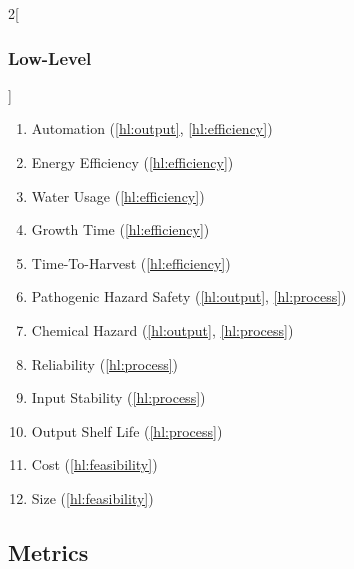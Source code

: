 \documentclass{../tex/report}
\begin{document}
\begin{multicols}{2}[\subsubsection{Low-Level}\label{sec:llos}]
\begin{enumerate}[label=LL\arabic*., ref=LL\arabic*]
        \item \label{ll:automation} Automation                              \hfill (\ref{hl:output}, \ref{hl:efficiency})
        \item \label{ll:efficiency_energy} Energy Efficiency                \hfill (\ref{hl:efficiency})
        \item \label{ll:efficiency_water} Water Usage                       \hfill (\ref{hl:efficiency})
        \item \label{ll:time_growth} Growth Time                            \hfill (\ref{hl:efficiency})
        \item \label{ll:time} Time-To-Harvest                               \hfill (\ref{hl:efficiency})
        \item \label{ll:safety_pathogen} Pathogenic Hazard Safety           \hfill (\ref{hl:output}, \ref{hl:process})
        \item \label{ll:safety_chemical} Chemical Hazard                    \hfill (\ref{hl:output}, \ref{hl:process})
        \item \label{ll:reliability} Reliability                            \hfill (\ref{hl:process})
        \item \label{ll:stability_input} Input Stability                    \hfill (\ref{hl:process})
        \item \label{ll:stability_output} Output Shelf Life                 \hfill (\ref{hl:process})
        \item \label{ll:cost} Cost                                          \hfill (\ref{hl:feasibility})
        \item \label{ll:size} Size                                          \hfill (\ref{hl:feasibility})
    \end{enumerate}
\end{multicols}

\clearpage

\subsection{Metrics}
\label{sec:metrics}
\end{document}
